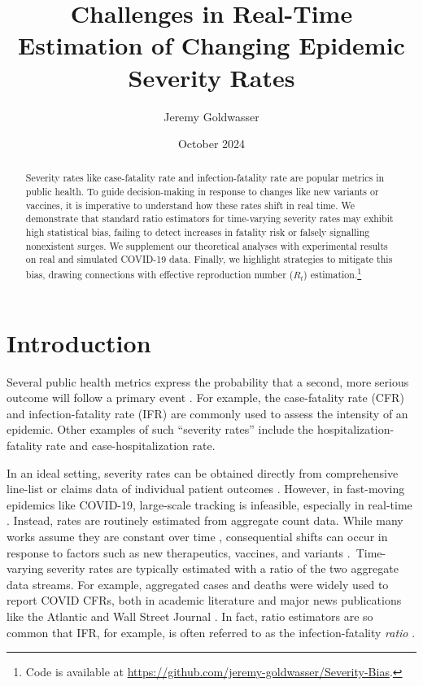 \documentclass{article}
\title{Challenges in Real-Time Estimation of Changing Epidemic Severity Rates}
\author{Jeremy Goldwasser}
\date{October 2024}
\begin{document}
\maketitle
\begin{abstract}
    Severity rates like case-fatality rate and infection-fatality rate are popular metrics in public health. To guide decision-making in response to changes like new variants or vaccines, it is imperative to understand how these rates shift in real time. We demonstrate that standard ratio estimators for time-varying severity rates may exhibit high statistical bias, failing to detect increases in fatality risk or falsely signalling nonexistent surges. We supplement our theoretical analyses with experimental results on real and simulated COVID-19 data. Finally, we highlight strategies to mitigate this bias, drawing connections with effective reproduction number ($R_t$) estimation.\footnote{Code is available at \url{https://github.com/jeremy-goldwasser/Severity-Bias}.}
\end{abstract}
\section{Introduction}

Several public health metrics express the probability that a second, more serious outcome will follow a primary event \citep{nishiuraEx1, nishiuraEx2, cfr_line_list, UKpaper, HFR_line_list1, HFR_linelist2, HFR_linelist3, lancet_ifr, timevar_ifr}. 
For example, the case-fatality rate (CFR) and infection-fatality rate (IFR) are commonly used to assess the intensity of an epidemic. 
Other examples of such “severity rates” include the hospitalization-fatality rate and case-hospitalization rate. 

In an ideal setting, severity rates can be obtained directly from comprehensive line-list or claims data of individual patient outcomes \citep{HFR_line_list1,HFR_linelist2,HFR_linelist3,cfr_line_list}. However, in fast-moving epidemics like COVID-19, large-scale tracking is infeasible, especially in real-time \citep{UKpaper}. Instead, rates are routinely estimated from aggregate count data. While many works assume they are constant over time \citep{reich2012estimating,ghani,jewell2007nonparametric,lancet_controversial}, consequential shifts can occur in response to factors such as new therapeutics, vaccines, and variants \citep{nyt}. Time-varying severity rates are typically estimated with a ratio of the two aggregate data streams.  For example, aggregated cases and deaths were widely used to report COVID CFRs, both in academic literature \citep{germany,horita2022global,timevar_ifr,yuan2020monitoring,LIU2023100350} and major news publications like the Atlantic \citep{atlantic} and Wall Street Journal \citep{wsj}. In fact, ratio estimators are so common that IFR, for example, is often referred to as the infection-fatality \textit{ratio} \citep{timevar_ifr, lancet_ifr}.
\end{document}
